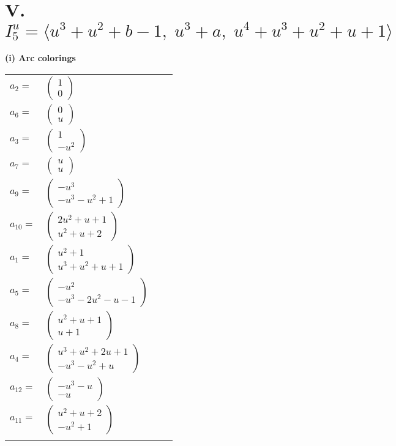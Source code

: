 \documentclass[1p]{elsarticle_modified}
\theoremstyle{definition}
\begin{document}
\centering \section*{V. $I^u_{5}= \langle u^3+u^2+b-1,\;u^3+a,\;u^4+u^3+u^2+u+1 \rangle$}
\flushleft \textbf{(i) Arc colorings}\\
\begin{tabular}{m{7pt} m{180pt} m{7pt} m{180pt} }
\flushright $a_{2}=$&$\begin{pmatrix}1\\0\end{pmatrix}$ \\
\flushright $a_{6}=$&$\begin{pmatrix}0\\u\end{pmatrix}$ \\
\flushright $a_{3}=$&$\begin{pmatrix}1\\- u^2\end{pmatrix}$ \\
\flushright $a_{7}=$&$\begin{pmatrix}u\\u\end{pmatrix}$ \\
\flushright $a_{9}=$&$\begin{pmatrix}- u^3\\- u^3- u^2+1\end{pmatrix}$ \\
\flushright $a_{10}=$&$\begin{pmatrix}2 u^2+u+1\\u^2+u+2\end{pmatrix}$ \\
\flushright $a_{1}=$&$\begin{pmatrix}u^2+1\\u^3+u^2+u+1\end{pmatrix}$ \\
\flushright $a_{5}=$&$\begin{pmatrix}- u^2\\- u^3-2 u^2- u-1\end{pmatrix}$ \\
\flushright $a_{8}=$&$\begin{pmatrix}u^2+u+1\\u+1\end{pmatrix}$ \\
\flushright $a_{4}=$&$\begin{pmatrix}u^3+u^2+2 u+1\\- u^3- u^2+u\end{pmatrix}$ \\
\flushright $a_{12}=$&$\begin{pmatrix}- u^3- u\\- u\end{pmatrix}$ \\
\flushright $a_{11}=$&$\begin{pmatrix}u^2+u+2\\- u^2+1\end{pmatrix}$\\&\end{tabular}
\end{document}
